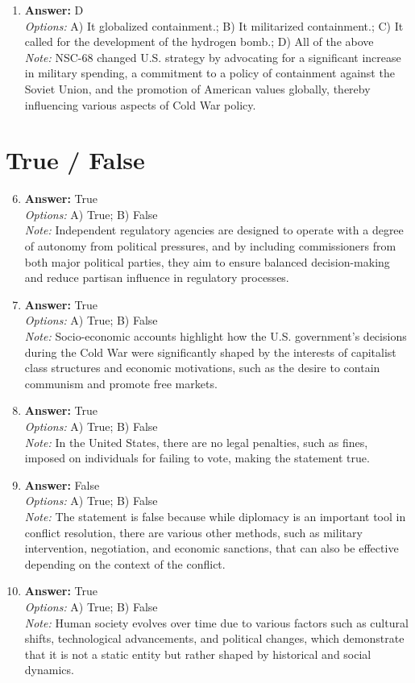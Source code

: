 \documentclass[12pt]{article}
\begin{document}
\begin{enumerate}[label=\arabic*.]
\item \textbf{Answer:} D
\\ \textit{Options:} A) It globalized containment.; B) It militarized containment.; C) It called for the development of the hydrogen bomb.; D) All of the above
\\ \textit{Note:} NSC-68 changed U.S. strategy by advocating for a significant increase in military spending, a commitment to a policy of containment against the Soviet Union, and the promotion of American values globally, thereby influencing various aspects of Cold War policy.
\end{enumerate}

\section*{True / False}
\begin{enumerate}[label=\arabic*.]
\setcounter{enumi}{5}
\item \textbf{Answer:} True
\\ \textit{Options:} A) True; B) False
\\ \textit{Note:} Independent regulatory agencies are designed to operate with a degree of autonomy from political pressures, and by including commissioners from both major political parties, they aim to ensure balanced decision-making and reduce partisan influence in regulatory processes.
\item \textbf{Answer:} True
\\ \textit{Options:} A) True; B) False
\\ \textit{Note:} Socio-economic accounts highlight how the U.S. government's decisions during the Cold War were significantly shaped by the interests of capitalist class structures and economic motivations, such as the desire to contain communism and promote free markets.
\item \textbf{Answer:} True
\\ \textit{Options:} A) True; B) False
\\ \textit{Note:} In the United States, there are no legal penalties, such as fines, imposed on individuals for failing to vote, making the statement true.
\item \textbf{Answer:} False
\\ \textit{Options:} A) True; B) False
\\ \textit{Note:} The statement is false because while diplomacy is an important tool in conflict resolution, there are various other methods, such as military intervention, negotiation, and economic sanctions, that can also be effective depending on the context of the conflict.
\item \textbf{Answer:} True
\\ \textit{Options:} A) True; B) False
\\ \textit{Note:} Human society evolves over time due to various factors such as cultural shifts, technological advancements, and political changes, which demonstrate that it is not a static entity but rather shaped by historical and social dynamics.
\end{enumerate}
\end{document}
